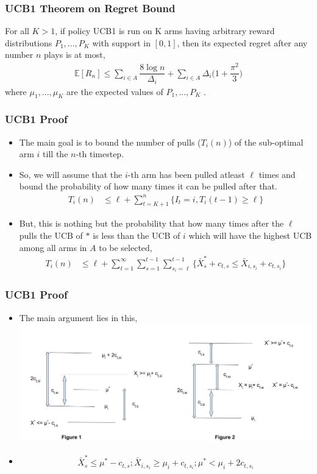 \begin{frame}
\frametitle{UCB1 Theorem on Regret Bound}
\begin{theorem}
For all $K > 1$, if policy UCB1 is run on K arms having arbitrary reward
distributions $P_{1}, . . . , P_{K}$ with support in $[0, 1]$, then its expected regret after any number $n$ plays is at most,
\begin{align*}
\mathbb{E}[R_n]\leq \sum_{i\in A}\dfrac{8\log n}{\Delta_{i}} + \sum_{i\in A}\Delta_{i}\bigg(1+\dfrac{\pi^{2}}{3}\bigg) 
\end{align*}
where $\mu_{1}, . . . , \mu_{K}$ are the expected values of $P_{1}, . . . , P_{K}$ .
\end{theorem}
\end{frame}

\begin{frame}
\frametitle{UCB1 Proof}
\begin{itemize}
\item<1-> The main goal is to bound the number of pulls ($T_i(n)$) of the sub-optimal arm $i$ till the $n$-th timestep.
\item<2-> So, we will assume that the $i$-th arm has been pulled atleast $\ell$ times and bound the probability of how many times it can be pulled after that.
\begin{align*}
T_{i}(n)&\leq \ell +\sum_{t=K+1}^{n}\lbrace I_t=i, T_i(t-1)\geq \ell\rbrace
\end{align*}
\item<3-> But, this is nothing but the probability that how many times after the $\ell$ pulls the UCB of $*$ is less than the UCB of $i$ which will have the highest UCB among all arms in $A$ to be selected,
\begin{align*}
T_{i}(n)&\leq \ell + \sum_{t=1}^{\infty}\sum_{s=1}^{t-1}\sum_{s_i =\ell}^{t-1}\lbrace \bar{X}_{s}^{*} + c_{t,s} \leq \bar{X}_{i,s_i} + c_{t,s_i} \rbrace
\end{align*}
\end{itemize}
\end{frame}

\begin{frame}
\frametitle{UCB1 Proof}
\begin{itemize}
\item<1-> The main argument lies in this, 
\includegraphics[scale=0.22]{img/UCB1_pic2} 
\item<1-> \begin{align*}
\bar{X}^{*}_{s}\leq \mu^* - c_{t,s};
\bar{X}_{i,s_i}\geq \mu_i + c_{t,s_i};
\mu^*  < \mu_i + 2c_{t,s_i}
\end{align*}
\end{itemize}
\end{frame}

